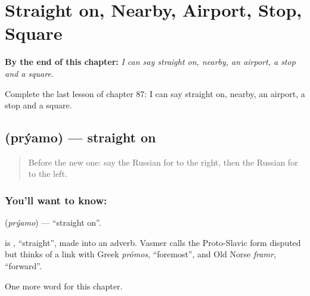 
\chapter{Straight on, Nearby, Airport, Stop, Square}
\label{ch:ru-straight-on-nearby-airport-stop-square}

\begin{chapteropening}
\textbf{By the end of this chapter:} \emph{I can say straight on, nearby, an airport, a stop and a square.}

Complete the last lesson of chapter 87: I can say straight on, nearby, an airport, a stop and a square.
\end{chapteropening}

\section[\texorpdfstring{\ru{прямо} (prýamo)}{прямо (prýamo)}]{ (prýamo) — straight on}

\label{lesson:RU-C87-straight-on}



\begin{quote}
Before the new one: say the Russian for to the right, then the Russian for to the left.
\end{quote}

\subsection*{You'll want to know: }
\textbf{} (\emph{prýamo}) — \textquotedblleft{}straight on\textquotedblright{}.

\begin{cousinweb}
\textbf{} is \emph{}, \textquotedblleft{}straight\textquotedblright{}, made into an adverb. Vasmer calls the Proto-Slavic form disputed but thinks of a link with Greek \emph{prómos}, \textquotedblleft{}foremost\textquotedblright{}, and Old Norse \emph{framr}, \textquotedblleft{}forward\textquotedblright{}.
\end{cousinweb}

\begin{grammarlens}[title={What you've built}]
One more word for this chapter.
\end{grammarlens}

